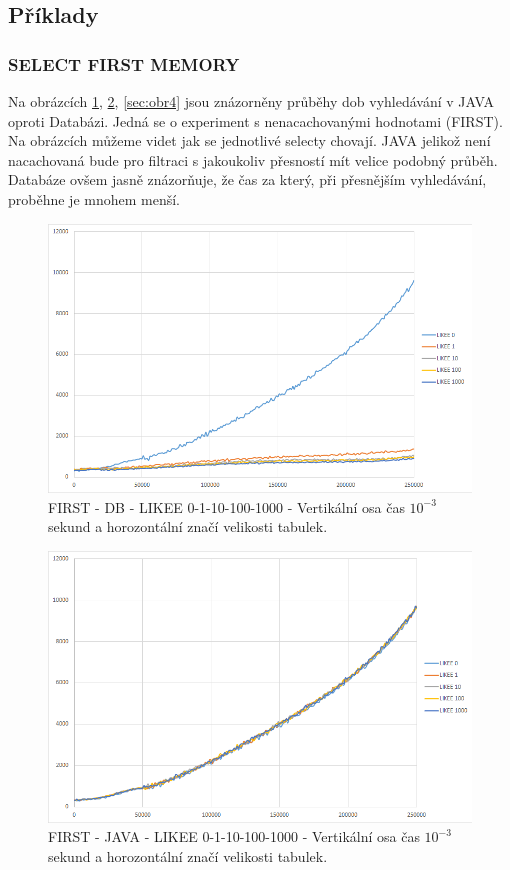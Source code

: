 \documentclass[a4paper, 11pt]{article}
\begin{document}
\subsection{Příklady} \label{priklady}

\subsubsection{SELECT FIRST MEMORY}
Na obrázcích \ref{sec:obr5}, \ref{sec:obr6}, \ref{sec:obr4} jsou znázorněny průběhy dob vyhledávání v JAVA oproti Databázi. Jedná se o experiment s nenacachovanými hodnotami (FIRST). Na obrázcích můžeme videt jak se jednotlivé selecty chovají. JAVA jelikož není nacachovaná bude pro filtraci  s jakoukoliv přesností mít velice podobný průběh. Databáze ovšem jasně znázorňuje, že čas za který, při přesnějším vyhledávání, proběhne je mnohem menší.

\begin{figure}[H]
\centering
\includegraphics[width=150mm, frame]{images/FIRST-DB.png}
\caption{FIRST - DB - LIKEE 0-1-10-100-1000 - Vertikální osa čas $10^{-3}$ sekund a horozontální značí velikosti tabulek.}
\label{sec:obr5}
\end{figure}

\begin{figure}[H]
\centering
\includegraphics[width=150mm, frame]{images/FIRST-JAVA.png}
\caption{FIRST - JAVA - LIKEE 0-1-10-100-1000 - Vertikální osa čas $10^{-3}$ sekund a horozontální značí velikosti tabulek.}
\label{sec:obr6}
\end{figure}
\end{document}
